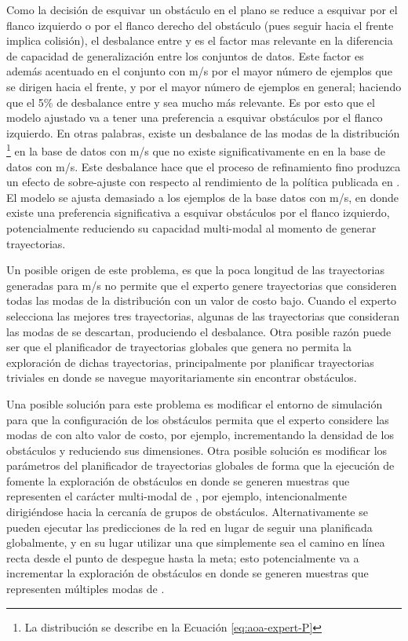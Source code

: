 Como la decisión de esquivar un obstáculo en el plano  se reduce a esquivar por el flanco izquierdo o por el flanco derecho del obstáculo (pues seguir hacia el frente implica colisión), el desbalance entre  y  es el factor mas relevante en la diferencia de capacidad de generalización entre los conjuntos de datos. Este factor es además acentuado en el conjunto con  m/s por el mayor número de ejemplos que se dirigen hacia el frente, y por el mayor número de ejemplos en general; haciendo que el 5\% de desbalance entre  y  sea mucho más relevante. Es por esto que el modelo ajustado va a tener una preferencia a esquivar obstáculos por el flanco izquierdo. En otras palabras, existe un desbalance de las modas de la distribución \footnote{La distribución  se describe en la Ecuación \ref{eq:aoa-expert-P}} en la base de datos con  m/s que no existe significativamente en en la base de datos con  m/s. Este desbalance hace que el proceso de refinamiento fino produzca un efecto de sobre-ajuste con respecto al rendimiento de la política publicada en \cite{Loquercio2021}. El modelo se ajusta demasiado a los ejemplos de la base datos con  m/s, en donde existe una preferencia significativa a esquivar obstáculos por el flanco izquierdo, potencialmente reduciendo su capacidad multi-modal al momento de generar trayectorias.

Un posible origen de este problema, es que la poca longitud de las trayectorias generadas para  m/s no permite que el experto genere trayectorias que consideren todas las modas de la distribución  con un valor de costo bajo. Cuando el experto selecciona las mejores tres trayectorias, algunas de las trayectorias que consideran las modas de  se descartan, produciendo el desbalance. Otra posible razón puede ser que el planificador de trayectorias globales que genera  no permita la exploración de dichas trayectorias, principalmente por planificar trayectorias triviales en donde se navegue mayoritariamente sin encontrar obstáculos. 

Una posible solución para este problema es modificar el entorno de simulación para que la configuración de los obstáculos permita que el experto considere las modas de  con alto valor de costo, por ejemplo, incrementando la densidad de los obstáculos y reduciendo sus dimensiones. Otra posible solución es modificar los parámetros del planificador de trayectorias globales de forma que la ejecución de  fomente la exploración de obstáculos en donde se generen muestras que representen el carácter multi-modal de , por ejemplo, intencionalmente dirigiéndose hacia la cercanía de grupos de obstáculos. Alternativamente se pueden ejecutar las predicciones de la red en lugar de seguir una  planificada globalmente, y en su lugar utilizar una  que simplemente sea el camino en línea recta desde el punto de despegue hasta la meta; esto potencialmente va a incrementar la exploración de obstáculos en donde se generen muestras que representen múltiples modas de .

